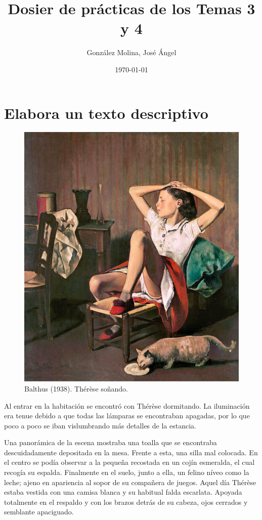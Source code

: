 \documentclass[12pt, a4paper, oneside]{report}
\title{Dosier de prácticas de los Temas 3 y 4}
\author{González Molina, José Ángel}
\date{\today}
\begin{document}
    \color{negro}
    \maketitle
    \clearpage

    \renewcommand{\chaptername}{Ejercicio}
    \renewcommand{\figurename}{Fig.}
    \chapter{Elabora un texto descriptivo}
        \begin{figure}[ht]
            \centering
            \includegraphics[scale = .7]{balthus}
            \caption{Balthus (1938). Thérèse soñando.}
        \end{figure}
        Al entrar en la habitación se encontró con Thérèse dormitando. La iluminación era tenue debido a que
        todas las lámparas se encontraban apagadas, por lo que poco a poco se iban vislumbrando más detalles
        de la estancia.

        Una panorámica de la escena mostraba una toalla que se encontraba descuidadamente depositada en la
        mesa. Frente a esta, una silla mal colocada. En el centro se podía observar a la pequeña recostada en
        un cojín esmeralda, el cual recogía su espalda. Finalmente en el suelo, junto a ella, un felino níveo
        como la leche; ajeno en apariencia al sopor de su compañera de juegos. Aquel día Thérèse estaba
        vestida con una camisa blanca y su habitual falda escarlata. Apoyada totalmente en el respaldo y con
        los brazos detrás de su cabeza, ojos cerrados y semblante apaciguado.
\end{document}

